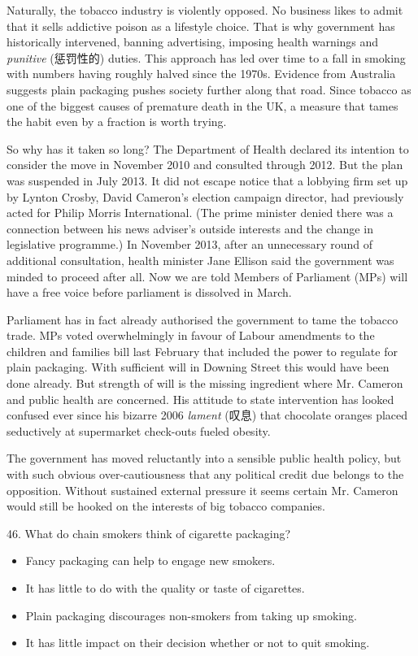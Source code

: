 \documentclass[UTF8,11pt]{ctexart}
\begin{document}
Naturally, the tobacco industry is violently opposed. No business likes to admit that it sells addictive poison as a lifestyle choice. That is why government has historically intervened, banning advertising, imposing health warnings and\textit{ punitive} (惩罚性的) duties. This approach has led over time to a fall in smoking with numbers having roughly halved since the 1970s. Evidence from Australia suggests plain packaging pushes society further along that road. Since tobacco as one of the biggest causes of premature death in the UK, a measure that tames the habit even by a fraction is worth trying.


So why has it taken so long? The Department of Health declared its intention to consider the move in November 2010 and consulted through 2012. But the plan was suspended in July 2013. It did not escape notice that a lobbying firm set up by Lynton Crosby, David Cameron’s election campaign director, had previously acted for Philip Morris International. (The prime minister denied there was a connection between his news adviser’s outside interests and the change in legislative programme.) In November 2013, after an unnecessary round of additional consultation, health minister Jane Ellison said the government was minded to proceed after all. Now we are told Members of Parliament (MPs) will have a free voice before parliament is dissolved in March.


Parliament has in fact already authorised the government to tame the tobacco trade. MPs voted overwhelmingly in favour of Labour amendments to the children and families bill last February that included the power to regulate for plain packaging. With sufficient will in Downing Street this would have been done already. But strength of will is the missing ingredient where Mr. Cameron and public health are concerned. His attitude to state intervention has looked confused ever since his bizarre 2006\textit{ lament} (叹息) that chocolate oranges placed seductively at supermarket check-outs fueled obesity.


The government has moved reluctantly into a sensible public health policy, but with such obvious over-cautiousness that any political credit due belongs to the opposition. Without sustained external pressure it seems certain Mr. Cameron would still be hooked on the interests of big tobacco companies.


46. What do chain smokers think of cigarette packaging?


\begin{itemize}[leftmargin=2em,itemsep=.2em,topsep=.4em]\item[A.] Fancy packaging can help to engage new smokers.
\item[B.] It has little to do with the quality or taste of cigarettes.
\item[C.] Plain packaging discourages non-smokers from taking up smoking.
\item[D.] It has little impact on their decision whether or not to quit smoking.
\end{itemize}
\end{document}
